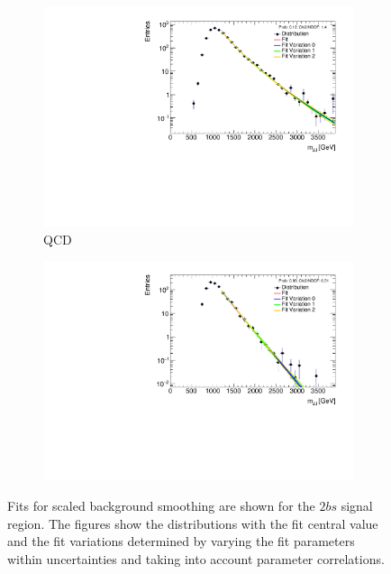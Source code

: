 \begin{figure}[htb!]
  \centering
  \captionsetup{justification=centering}
    \hspace{-2.5cm}
    \begin{subfigure}[b]{0.35\textwidth}
        \includegraphics[width=\textwidth,angle=-90]{figures/boosted/Smooth/qcd_est_TwoTag_split_Signal_mHH_pole_l.pdf}
        \caption{QCD}
        \label{fig:signal-region-mjjscaled-smoothing-2b-qcd}
    \end{subfigure}
    \quad \quad \quad \quad \quad
    \begin{subfigure}[b]{0.35\textwidth}
        \includegraphics[width=\textwidth,angle=-90]{figures/boosted/Smooth/ttbar_est_TwoTag_split_Signal_mHH_pole_l.pdf}
        \caption{\ttbar}
        \label{fig:signal-region-mjjscaled-smoothing-2b-ttbar}
    \end{subfigure}
    \caption{Fits for scaled background smoothing are shown for the $2bs$ signal region. The figures show the distributions with the fit central value and the fit variations determined by varying the fit parameters within uncertainties and taking into account parameter correlations.}
  \label{fig:signal-region-mjjscaled-smoothing-2b}
\end{figure}

